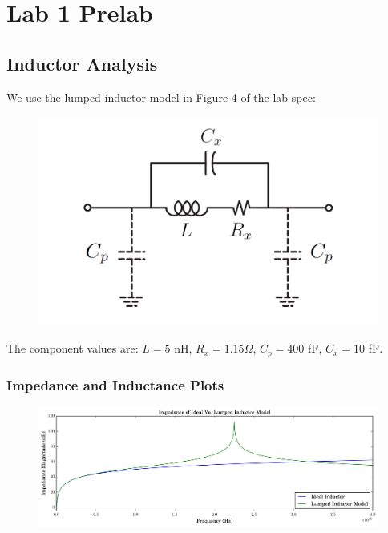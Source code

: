 \documentclass[11pt]{article}
\begin{document}
\section{Lab 1 Prelab}

\subsection{Inductor Analysis}
We use the lumped inductor model in Figure 4 of the lab spec:

\begin{figure}[H]
	\centering \includegraphics[width=\textwidth-8cm]{images/lumped_inductor_model.png}
\end{figure}

The component values are: $L = 5$ nH, $R_{x} = 1.15\Omega$, $C_{p} = 400$ fF, $C_{x} = 10$ fF.

\subsubsection{Impedance and Inductance Plots}

\begin{figure}[H]
	\centering \includegraphics[width=\textwidth]{images/inductor_impedance.png}
\end{figure}
\end{document}
